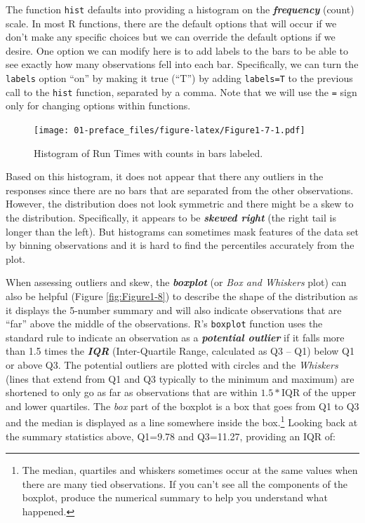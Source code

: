 \documentclass[]{book}
\newenvironment{Shaded}{\begin{snugshade}}{\end{snugshade}}
\newcommand{\DataTypeTok}[1]{\textcolor[rgb]{0.13,0.29,0.53}{#1}}
\newcommand{\KeywordTok}[1]{\textcolor[rgb]{0.13,0.29,0.53}{\textbf{#1}}}
\newcommand{\NormalTok}[1]{#1}
\newcommand{\OperatorTok}[1]{\textcolor[rgb]{0.81,0.36,0.00}{\textbf{#1}}}
\newcommand{\StringTok}[1]{\textcolor[rgb]{0.31,0.60,0.02}{#1}}
\let\rmarkdownfootnote\footnote%
\def\footnote{\protect\rmarkdownfootnote}
\renewcommand{\indent}{\hspace{15pt}}
\renewenvironment{Shaded}{%
\setlength{\FrameRule}{1.5pt}
\def\FrameCommand{\fboxrule=\FrameRule\fboxsep=5pt 
                  \fcolorbox{framecolor}{shadecolor}}%
\MakeFramed {\FrameRestore}}%
{\endMakeFramed}
\begin{document}
\indent The function \texttt{hist} defaults into providing a histogram on the \textbf{\emph{frequency}}
(count) scale. In most R functions, there are the default options that will
occur if we don't make any specific choices but we
can override the default options if we desire. One option we can modify here is
to add labels to the bars to be able to see exactly how many observations fell
into each bar. Specifically, we can turn the \texttt{labels} option ``on'' by making it true (``T'') by adding \texttt{labels=T} to the previous call to the \texttt{hist} function, separated by a comma. Note that we will use the \texttt{=} sign only for changing options within functions.

\begin{Shaded}
\end{Shaded}



\begin{figure}
\centering
\texttt{[image: 01-preface\_files/figure-latex/Figure1-7-1.pdf]}
\caption{\label{fig:Figure1-7}Histogram of Run Times with counts in bars labeled.}
\end{figure}

\indent Based on this histogram, it does not appear that there any outliers in the responses
since there are no bars that are separated from the other observations. However,
the distribution does not look symmetric and there might be a skew to the
distribution. Specifically, it appears to be \textbf{\emph{skewed right}} (the right tail is longer than the left). But histograms can sometimes mask features of
the data set by binning observations and it is hard to find the percentiles
accurately from the plot.

\indent When assessing outliers and skew, the \textbf{\emph{boxplot}}
(or \emph{Box and Whiskers} plot) can also be helpful (Figure \ref{fig:Figure1-8}) to describe the
shape of the distribution as it displays the 5-number summary and will also indicate
observations that are ``far'' above the middle of the observations.
R's \texttt{boxplot} function uses the standard rule to indicate an observation as a
\textbf{\emph{potential outlier}} if it falls more than 1.5 times the \textbf{\emph{IQR}}
(Inter-Quartile Range, calculated as Q3 -- Q1) below Q1 or above Q3.
The potential outliers
are plotted with circles and the \emph{Whiskers} (lines that extend from Q1 and Q3 typically to
the minimum and maximum) are shortened to only go as far as
observations that are within \(1.5*\)IQR of the upper and lower quartiles. The \emph{box}
part of the boxplot is a box that goes from Q1 to Q3 and the median is displayed as a line
somewhere inside the box.\footnote{The median, quartiles and whiskers sometimes occur at the same
  values when there are many tied observations. If you can't see all the
  components of the boxplot, produce the numerical summary to help you understand
  what happened.} Looking back at the summary statistics above, Q1=9.78 and Q3=11.27, providing an IQR of:
\end{document}
